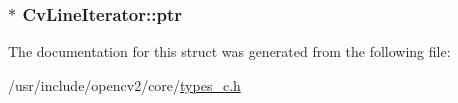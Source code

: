 \hypertarget{structCvLineIterator_a4b9a839ba96ac5483b34bc9d0e62d7bc}{
\subsubsection[{ptr}]{$\ast$ Cv\-Line\-Iterator\-::ptr}}\label{structCvLineIterator_a4b9a839ba96ac5483b34bc9d0e62d7bc}


The documentation for this struct was generated from the following file\-:\begin{DoxyCompactItemize}
\item 
/usr/include/opencv2/core/\hyperlink{core_2types__c_8h}{types\-\_\-c.\-h}\end{DoxyCompactItemize}

